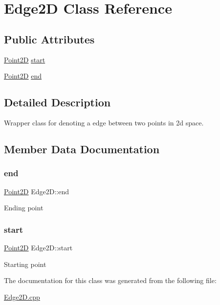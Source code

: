 \hypertarget{class_edge2_d}{}\section{Edge2D Class Reference}
\label{class_edge2_d}
\subsection*{Public Attributes}
\begin{DoxyCompactItemize}
\item 
\hyperlink{class_point2_d}{Point2D} \hyperlink{class_edge2_d_ace5dfa4630ee5983c88fe95a2e0e6745}{start}
\item 
\hyperlink{class_point2_d}{Point2D} \hyperlink{class_edge2_d_a8836dcb587b02ba8a70f8e80ba849943}{end}
\end{DoxyCompactItemize}


\subsection{Detailed Description}
Wrapper class for denoting a edge between two points in 2d space. 

\subsection{Member Data Documentation}
\mbox{\label{class_edge2_d_a8836dcb587b02ba8a70f8e80ba849943}} 
\subsubsection{\texorpdfstring{end}{end}}
{\footnotesize\ttfamily \hyperlink{class_point2_d}{Point2D} Edge2\+D\+::end}

Ending point \mbox{\label{class_edge2_d_ace5dfa4630ee5983c88fe95a2e0e6745}} 
\subsubsection{\texorpdfstring{start}{start}}
{\footnotesize\ttfamily \hyperlink{class_point2_d}{Point2D} Edge2\+D\+::start}

Starting point 

The documentation for this class was generated from the following file\+:\begin{DoxyCompactItemize}
\item 
\hyperlink{_edge2_d_8cpp}{Edge2\+D.\+cpp}\end{DoxyCompactItemize}
